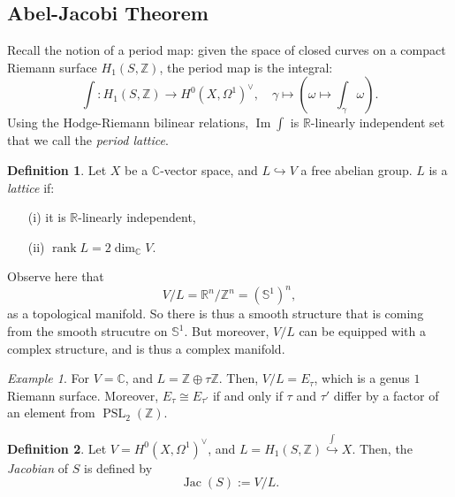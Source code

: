 \documentclass[a4paper]{report}
\theoremstyle{definition}
\newtheorem{definition}{Definition}
\theoremstyle{remark}
\theoremstyle{proposition}
\theoremstyle{conjecture}
\theoremstyle{lemma}
\theoremstyle{corollary}
\theoremstyle{exercise}
\theoremstyle{example}
\newtheorem{example}{Example}
\newcommand{\C}{\mathbb{C}}
\newcommand{\on}{\operatorname}
\begin{document}
\subsection{Abel-Jacobi Theorem}

Recall the notion of a period map: given the space of closed curves 
on a compact Riemann surface $H_1(S,\mathbb{Z})$, the period map is 
the integral:
$$\int : H_1(S,\mathbb{Z}) \longrightarrow H^0(X,\Omega^1)^\vee,\quad \gamma \longmapsto \left(\omega \longmapsto \int_\gamma\omega\right).$$
Using the Hodge-Riemann bilinear relations, $\on{Im}\int$ is 
$\mathbb{R}$-linearly independent set that we call the 
\emph{period lattice}.

\begin{definition}
    Let $X$ be a $\C$-vector space, and $L\hookrightarrow V$ a free
    abelian group. $L$ is a \emph{lattice} if:
    \begin{itemize}
        \item[(i)] it is $\mathbb{R}$-linearly independent,
        \item[(ii)] $\on{rank}L = 2\dim_\C V$.
    \end{itemize}
\end{definition}

Observe here that 
$$V/L = \mathbb{R}^n/\mathbb{Z}^n = (\mathbb{S}^1)^n,$$
as a topological manifold. So there is thus a smooth structure that is 
coming from the smooth strucutre on $\mathbb{S}^1$. But moreover,
$V/L$ can be equipped with a complex structure, and is thus a complex 
manifold.

\begin{example}
    For $V=\C$, and $L = \mathbb{Z}\oplus\tau\mathbb{Z}$.
    Then, $V/L = E_\tau$, which is a genus $1$ Riemann surface.
    Moreover, $E_\tau\cong E_{\tau'}$ if and only if $\tau$ and 
    $\tau'$ differ by a factor of an element from $\on{PSL}_2(\mathbb{Z})$.
\end{example}

\begin{definition}
    Let $V = H^0(X,\Omega^1)^\vee$, and $L = H_1(S,\mathbb{Z}) \stackrel{\int}{\hookrightarrow} X$.
    Then, the \emph{Jacobian} of $S$ is defined by 
    $$\on{Jac}(S) := V/L.$$
\end{definition}
\end{document}
